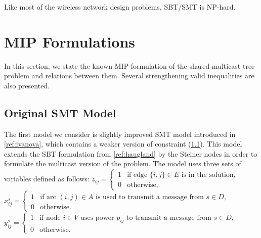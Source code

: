 Like most of the wireless network design problems, SBT/SMT is NP-hard.
\section{MIP Formulations}
\label{sec:ILP}
In this section, we state the known MIP formulation of the shared multicast tree problem and relations between them. Several strengthening valid inequalities are also presented.
\subsection{Original SMT Model}
The first model we consider is slightly improved SMT model introduced in \ref{ref:ivanova}, which contains a weaker version of constraint (\ref{}). This model extends the SBT formulation from \ref{ref:haugland} by the Steiner nodes in order to formulate the multicast version of the problem. The model uses three sets of variables defined as follows:
\newline\newline
  $z_{ij}=
	\begin{cases}
    1 & \text{if edge $\{i,j\} \in E$ is in the solution},\\
    0 & \text{otherwise},
  \end{cases}$
\newline\newline
  $x^{s}_{ij}=
	\begin{cases}
    1 & \text{if arc $(i,j) \in A$ is used to transmit a message from $s\in D$},\\
    0 & \text{otherwise}.
  \end{cases}$
  \newline\newline
  $y^s_{ij}=
	\begin{cases}
    1 & \text{if node $i \in V$ uses power $p_{ij}$ to transmit a message from $s\in D$},\\
    0 & \text{otherwise}.
  \end{cases}$
\newline
\newline    
